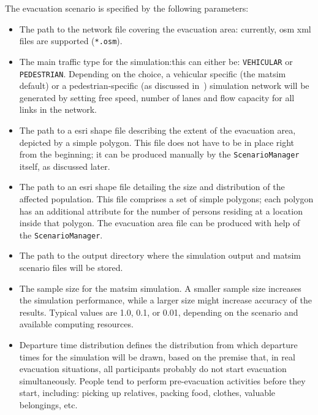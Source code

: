 The evacuation scenario is specified by the following parameters:
\begin{itemize}\styleItemize
\item The path to the network file covering the evacuation area: currently, \gls{osm} \gls{xml} files are supported (\lstinline|*.osm|).
\item The main traffic type for the simulation:this can either be: \lstinline|VEHICULAR| or \lstinline|PEDESTRIAN|. Depending on the choice, a vehicular specific (the \gls{matsim} default) or a pedestrian-specific (as discussed in~\citet{00LaemmelKluepfelNagel2009EvacPadangAtBookTimmermanns,Laemmel_PhDThesis_2011}) simulation network will be generated by setting free speed, number of lanes and flow capacity for all links in the network.
\item The path to a \gls{esri} shape file describing the extent of the evacuation area, depicted by a simple polygon. This file does not have to be in place right from the beginning; it can be produced manually by the \lstinline|ScenarioManager| itself, as discussed later.
\item The path to an \gls{esri} shape file detailing the size and distribution of the affected population. This file comprises a set of simple polygons; each polygon has an additional attribute for the number of persons residing at a location inside that polygon. The evacuation area file can be produced with help of the \lstinline|ScenarioManager|.
\item The path to the output directory where the simulation output and \gls{matsim} scenario files will be stored.
\item The sample size for the \gls{matsim} simulation. A smaller sample size increases the simulation performance, while a larger size might increase accuracy of the results. Typical values are 1.0, 0.1, or 0.01, depending on the scenario and available computing resources.
\item Departure time distribution defines the distribution from which departure times for the simulation will be drawn, based on the premise that, in real evacuation situations, all participants probably do not start evacuation simultaneously. 
People tend to perform pre-evacuation activities before they start, including: picking up relatives, packing food, clothes, valuable belongings, etc. 

\end{itemize}
